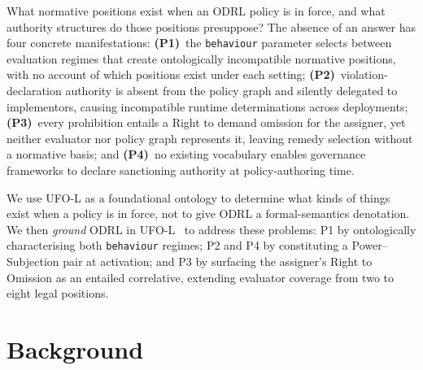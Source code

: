 \documentclass{IOS-Book-Article}
\theoremstyle{definition}
\begin{document}
What normative positions exist when an ODRL policy is in
force, and what authority structures do those positions
presuppose? The absence of an answer has four concrete
manifestations: \textbf{(P1)}~the \texttt{behaviour} parameter selects between evaluation regimes that create ontologically
incompatible normative positions, with no account of which
positions exist under each setting;
\textbf{(P2)}~violation-declaration authority is absent
from the policy graph and silently delegated to
implementors, causing incompatible runtime determinations
across deployments;
\textbf{(P3)}~every prohibition entails a Right to demand
omission for the assigner, yet neither evaluator nor
policy graph represents it, leaving remedy selection
without a normative basis; and
\textbf{(P4)}~no existing vocabulary enables governance
frameworks to declare sanctioning authority at
policy-authoring time.

We use UFO-L as a foundational ontology to determine 
what kinds of things exist when a policy is in 
force, not to give ODRL a formal-semantics denotation. 
We then \emph{ground} ODRL in 
UFO-L~\cite{griffo2018conceptual,griffo2023powers} to 
address these problems:
P1 by ontologically characterising both \texttt{behaviour}
regimes; P2 and P4 by
constituting a Power--Subjection pair at activation; and P3 by surfacing
the assigner's Right to Omission as an entailed
correlative, extending evaluator coverage from two to eight legal positions.

\section{Background}
\end{document}
